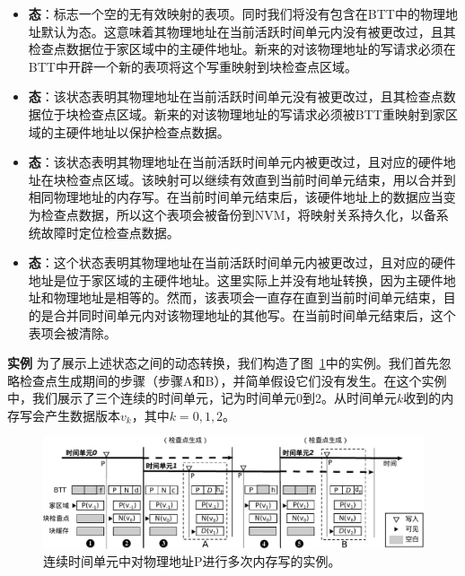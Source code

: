 \begin{itemize}
\item \textbf{态}：标志一个空的无有效映射的表项。同时我们将没有包含在BTT中的物理地址默认为态。这意味着其物理地址在当前活跃时间单元内没有被更改过，且其检查点数据位于家区域中的主硬件地址。新来的对该物理地址的写请求必须在BTT中开辟一个新的表项将这个写重映射到块检查点区域。

\item \textbf{态}：该状态表明其物理地址在当前活跃时间单元没有被更改过，且其检查点数据位于块检查点区域。新来的对该物理地址的写请求必须被BTT重映射到家区域的主硬件地址以保护检查点数据。

\item \textbf{态}：该状态表明其物理地址在当前活跃时间单元内被更改过，且对应的硬件地址在块检查点区域。该映射可以继续有效直到当前时间单元结束，用以合并到相同物理地址的内存写。在当前时间单元结束后，该硬件地址上的数据应当变为检查点数据，所以这个表项会被备份到NVM，将映射关系持久化，以备系统故障时定位检查点数据。

\item \textbf{态}：这个状态表明其物理地址在当前活跃时间单元内被更改过，且对应的硬件地址是位于家区域的主硬件地址。这里实际上并没有地址转换，因为主硬件地址和物理地址是相等的。然而，该表项会一直存在直到当前时间单元结束，目的是合并同时间单元内对该物理地址的其他写。在当前时间单元结束后，这个表项会被清除。
\end{itemize}

\vspace{\noindentsep}
\noindent \textbf{实例  }为了展示上述状态之间的动态转换，我们构造了图~\ref{fig-example}中的实例。我们首先忽略检查点生成期间的步骤（步骤A和B），并简单假设它们没有发生。在这个实例中，我们展示了三个连续的时间单元，记为时间单元0到2。从时间单元$k$收到的内存写会产生数据版本$v_k$，其中$k = 0, 1, 2$。

\begin{figure}[!ht]
\centering
\includegraphics[width=\linewidth]{figures/example.pdf}
\caption{连续时间单元中对物理地址P进行多次内存写的实例。}
\label{fig-example}
\end{figure}

